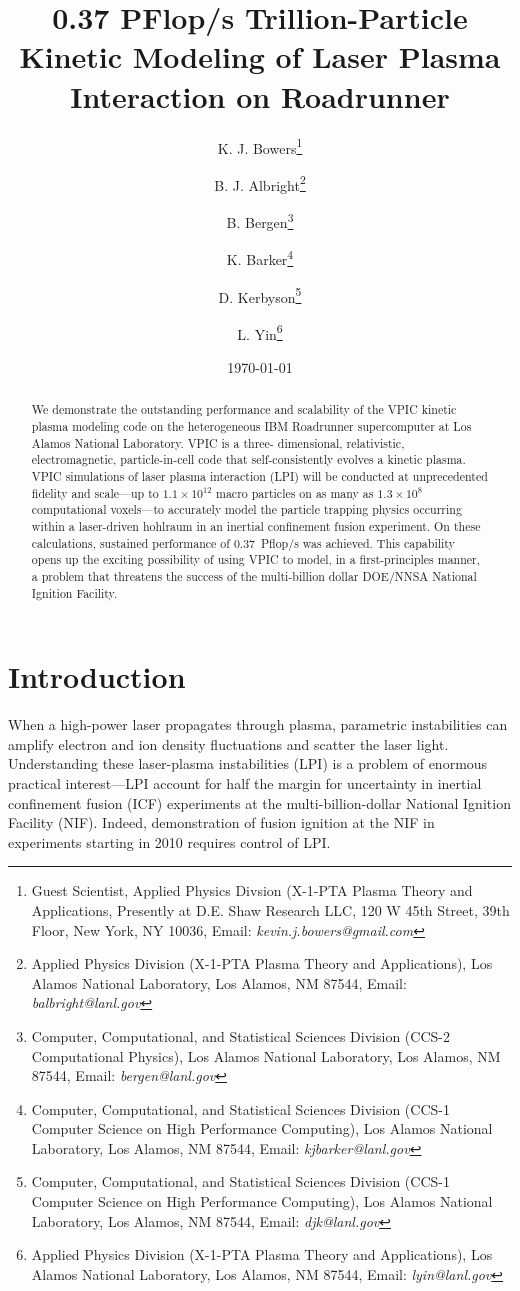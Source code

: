\documentclass[10pt]{article}
\title{0.37 PFlop/s Trillion-Particle Kinetic Modeling of Laser Plasma Interaction on Roadrunner}
\author{%
K. J. Bowers\thanks{Guest Scientist, Applied Physics Divsion (X-1-PTA Plasma Theory and Applications, Presently at D.E. Shaw Research LLC, 120 W 45th Street, 39th Floor, New York, NY 10036, Email: \emph{kevin.j.bowers@gmail.com}} \and%
%
B. J. Albright\thanks{Applied Physics Division (X-1-PTA Plasma Theory and Applications), Los Alamos National Laboratory, Los Alamos, NM 87544, Email: \emph{balbright@lanl.gov}} \and%
%
B. Bergen\thanks{Computer, Computational, and Statistical Sciences Division (CCS-2 Computational Physics), Los Alamos National Laboratory, Los Alamos, NM 87544, Email: \emph{bergen@lanl.gov}} \and%
%
K. Barker\thanks{Computer, Computational, and Statistical Sciences Division (CCS-1 Computer Science on High Performance Computing), Los Alamos National Laboratory, Los Alamos, NM 87544, Email: \emph{kjbarker@lanl.gov}} \and%
%
D. Kerbyson\thanks{Computer, Computational, and Statistical Sciences Division (CCS-1 Computer Science on High Performance Computing), Los Alamos National Laboratory, Los Alamos, NM 87544, Email: \emph{djk@lanl.gov}} \and%
%
L. Yin\thanks{Applied Physics Division (X-1-PTA Plasma Theory and Applications), Los Alamos National Laboratory, Los Alamos, NM 87544, Email: \emph{lyin@lanl.gov}}}
\date{\today}
\begin{document}
\maketitle
\thispagestyle{empty}

\begin{singlespace}
\begin{abstract}
We demonstrate the outstanding performance and scalability of the VPIC 
kinetic plasma modeling code on the heterogeneous IBM Roadrunner 
supercomputer at Los Alamos National Laboratory.  VPIC is a three-
dimensional, relativistic, electromagnetic, particle-in-cell code that 
self-consistently evolves a kinetic plasma.  VPIC simulations of laser 
plasma interaction (LPI) will be conducted at unprecedented fidelity 
and scale---up to $1.1 \times 10^{12}$ macro particles on as many as 
$1.3 \times 10^8$ 
computational voxels---to accurately model the particle trapping physics 
occurring within a laser-driven hohlraum in an inertial confinement 
fusion experiment.  On these calculations, sustained performance of 
0.37~Pflop/s was 
achieved.  This capability opens up the exciting possibility of using 
VPIC to model, in a first-principles manner, a problem that threatens 
the success of the multi-billion dollar DOE/NNSA National Ignition Facility.  
\end{abstract}
\end{singlespace}

\pagebreak

\section*{Introduction}

When a high-power laser propagates through plasma, parametric
instabilities can amplify electron and ion density fluctuations and
scatter the laser light.  Understanding these laser-plasma
instabilities (LPI) is a problem of enormous practical interest---LPI
account for half the margin for uncertainty in inertial confinement
fusion (ICF) experiments at the multi-billion-dollar National Ignition
Facility (NIF).  Indeed, demonstration of fusion ignition at the NIF
in experiments starting in 2010 requires control of LPI.
\end{document}
